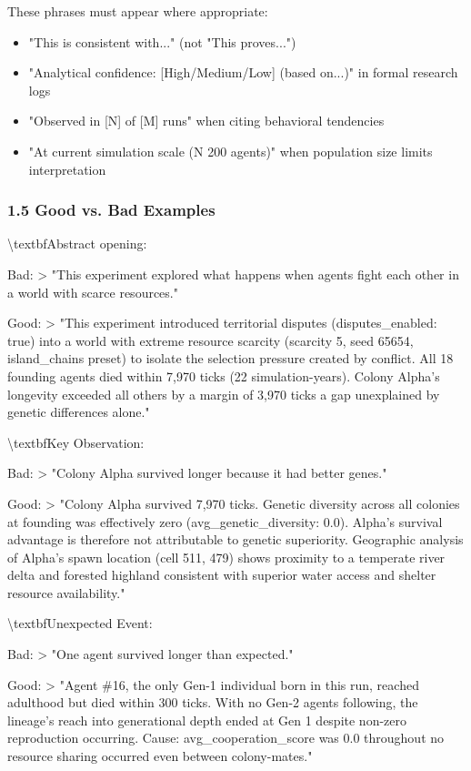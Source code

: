 \documentclass[11pt,a4paper]{article}
\begin{document}
These phrases must appear where appropriate:

\begin{itemize}
  \item "This is consistent with..." (not "This proves...")
  \item "Analytical confidence: [High/Medium/Low] (based on...)" in formal research logs
  \item "Observed in [N] of [M] runs" when citing behavioral tendencies
  \item "At current simulation scale (N  200 agents)" when population size limits interpretation
\end{itemize}

\subsubsection*{1.5 Good vs. Bad Examples}

\textbackslash{}textbf{Abstract opening:}

 Bad:
\textgreater{} "This experiment explored what happens when agents fight each other in a world with scarce resources."

 Good:
\textgreater{} "This experiment introduced territorial disputes (disputes\_enabled: true) into a world with extreme resource scarcity (scarcity 5, seed 65654, island\_chains preset) to isolate the selection pressure created by conflict. All 18 founding agents died within 7,970 ticks (22 simulation-years). Colony Alpha's longevity exceeded all others by a margin of 3,970 ticks  a gap unexplained by genetic differences alone."

\textbackslash{}textbf{Key Observation:}

 Bad:
\textgreater{} "Colony Alpha survived longer because it had better genes."

 Good:
\textgreater{} "Colony Alpha survived 7,970 ticks. Genetic diversity across all colonies at founding was effectively zero (avg\_genetic\_diversity: 0.0). Alpha's survival advantage is therefore not attributable to genetic superiority. Geographic analysis of Alpha's spawn location (cell 511, 479) shows proximity to a temperate river delta and forested highland  consistent with superior water access and shelter resource availability."

\textbackslash{}textbf{Unexpected Event:}

 Bad:
\textgreater{} "One agent survived longer than expected."

 Good:
\textgreater{} "Agent \#16, the only Gen-1 individual born in this run, reached adulthood but died within 300 ticks. With no Gen-2 agents following, the lineage's reach into generational depth ended at Gen 1 despite non-zero reproduction occurring. Cause: avg\_cooperation\_score was 0.0 throughout  no resource sharing occurred even between colony-mates."
\end{document}
